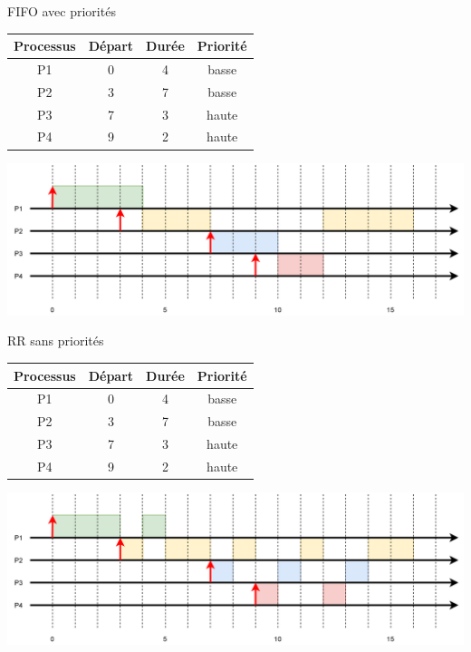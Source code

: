 \documentclass[10pt]{beamer}
\begin{document}
\begin{frame}{FIFO avec priorités}
\scriptsize
\begin{center}
\begin{tabular}{|c|c|c|c|}
\hline\rowcolor{beamerRed}
\textbf{\color{white} Processus} & \textbf{\color{white}Départ} & \textbf{\color{white}Durée} & \textbf{\color{white}Priorité} \\
\hline
P1 & 0 & 4 & basse \\
\hline
P2 & 3 & 7 & basse \\
\hline
P3 & 7 & 3 & haute \\
\hline
P4 & 9 & 2 & haute \\
\hline
\end{tabular}
\end{center}
\includegraphics[width=\linewidth]{img/FIFOP}
\end{frame}
\begin{frame}{RR sans priorités}
\scriptsize
\begin{center}
\begin{tabular}{|c|c|c|c|}
\hline\rowcolor{beamerRed}
\textbf{\color{white} Processus} & \textbf{\color{white}Départ} & \textbf{\color{white}Durée} & \textbf{\color{white}Priorité} \\
\hline
P1 & 0 & 4 & basse \\
\hline
P2 & 3 & 7 & basse \\
\hline
P3 & 7 & 3 & haute \\
\hline
P4 & 9 & 2 & haute \\
\hline
\end{tabular}
\end{center}
\includegraphics[width=\linewidth]{img/RR}
\end{frame}
\end{document}
